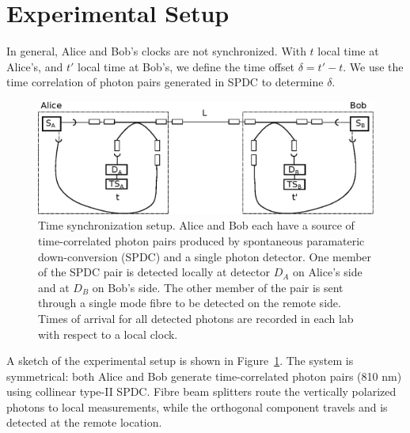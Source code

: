 \documentclass[aps,pra,onecolumn, superscriptaddress]{revtex4}
\begin{document}
\section{Experimental Setup}
      
In general, Alice and Bob's clocks are not synchronized.
With $t$ local time at Alice's, and $ t'$ local time at Bob's,
we define the time offset $\delta = t' - t$.
We use the time correlation of photon pairs generated in SPDC to determine $\delta$.

\begin{figure}[htbp]
  \centering
  \includegraphics[width=16cm]{figures/setup_simplified.eps}
  \caption{\label{fig:setup}
  Time synchronization setup. Alice and Bob each have a source of time-correlated photon pairs produced by spontaneous paramateric down-conversion (SPDC) and a single photon detector. One member of the SPDC pair is detected locally at detector $D_A$ on Alice's side and at $D_B$ on Bob's side. The other member of the pair is sent through a single mode fibre to be detected on the remote side. Times of arrival for all detected photons are recorded in each lab with respect to a local clock. 
  }
\end{figure}

A sketch of the experimental setup is shown in Figure~\ref{fig:setup}.
The system is symmetrical: both Alice and Bob generate time-correlated photon pairs (810 nm) using collinear type-II SPDC.
Fibre beam splitters route the vertically polarized photons to local measurements, while the orthogonal component travels and is detected at the remote location.
\end{document}
